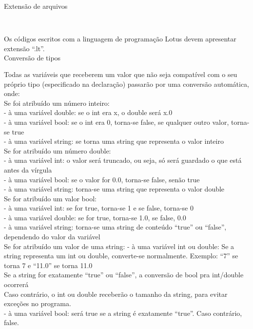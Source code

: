 \documentclass[12pt,a4paper]{article}
\begin{document}
\hypertarget{label7}{\Large{Extensão de arquivos}}\\[0.3cm]
\normalsize

Os códigos escritos com a linguagem de programação Lotus devem apresentar extensão ``.lt''.\\


\hypertarget{label8}{\Large{Conversão de tipos}}\\[0.3cm]
\normalsize

Todas as variáveis que receberem um valor que não seja compatível com o seu próprio tipo (especificado na declaração) passarão por uma conversão automática, onde: \\

Se foi atribuído um número inteiro:\\
- à uma variável double: se o int era x, o double será x.0\\
- à uma variável bool: se o int era 0, torna-se false, se qualquer outro valor, torna-se true\\
- à uma variável string: se torna uma string que representa o valor inteiro\\[0.3cm]

Se for atribuído um número double:\\
- à uma variável int: o valor será truncado, ou seja, só será guardado o que está antes da vírgula\\
- à uma variável bool: se o valor for 0.0, torna-se false, senão true\\
- à uma variável string: torna-se uma string que representa o valor double\\[0.3cm]

Se for atribuído um valor bool:\\
- à uma variável int: se for true, torna-se 1 e se false, torna-se 0\\
- à uma variável double: se for true, torna-se 1.0, se false, 0.0\\
- à uma variável string: torna-se uma string de conteúdo ``true'' ou ``false'', dependendo do valor da variável\\[0.3cm]

Se for atribuído um valor de uma string:
- à uma variável int ou double: Se a string representa um int ou double, converte-se normalmente. Exemplo: ``7'' se torna 7 e ``11.0'' se torna 11.0\\
Se a string for exatamente ``true'' ou ``false'', a conversão de bool pra int/double ocorrerá\\
Caso contrário, o int ou double receberão o tamanho da string, para evitar exceções no programa.\\
- à uma variável bool: será true se a string é exatamente ``true''. Caso contrário, false.\\
\end{document}
